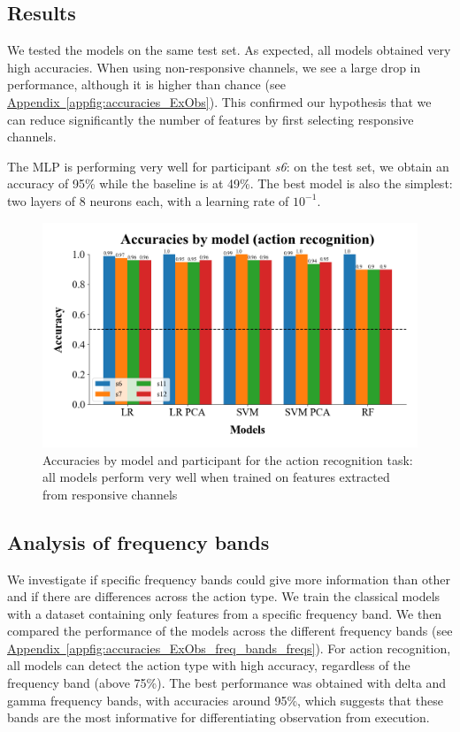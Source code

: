 \documentclass[10pt,conference,compsocconf]{IEEEtran}
\newcommand{\aref}[1]{\hyperref[#1]{Appendix~\ref*{#1}}}
\begin{document}
\subsection{Results}
We tested the models on the same test set. As expected, all models obtained very high accuracies. When using non-responsive channels, we see a large drop in performance, although it is higher than chance (see \aref{appfig:accuracies_ExObs}). This confirmed our hypothesis that we can reduce significantly the number of features by first selecting responsive channels.

The MLP is performing very well for participant \textit{s6}: on the test set, we obtain an accuracy of 95\% while the baseline is at 49\%. The best model is also the simplest: two layers of 8 neurons each, with a learning rate of \(10^{-1}\).

\begin{figure}[h!]
  \center
  \includegraphics[width=\linewidth]{../Code/figures/accuracies_across_part_ExObs.png}
  \caption{Accuracies by model and participant for the action recognition task: all models perform very well when trained on features extracted from responsive channels}
\end{figure}
\FloatBarrier

\subsection{Analysis of frequency bands}
We investigate if specific frequency bands could give more information than other and if there are differences across the action type. We train the classical models with a dataset containing only features from a specific frequency band. We then compared the performance of the models across the different frequency bands (see \aref{appfig:accuracies_ExObs_freq_bands_freqs}). For action recognition, all models can detect the action type with high accuracy, regardless of the frequency band (above 75\%). The best performance was obtained with delta and gamma frequency bands, with accuracies around 95\%, which suggests that these bands are the most informative for differentiating observation from execution.
\end{document}
